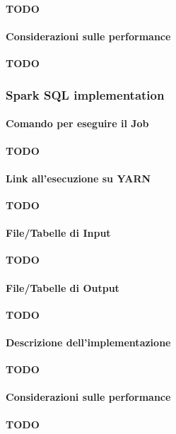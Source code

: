   \textbf{TODO}

  \paragraph{Considerazioni sulle performance}\label{par:job2:mapreduce:performance}

  \textbf{TODO}

  \subsubsection{Spark SQL implementation}\label{subsub:job2:spark}

  \paragraph{Comando per eseguire il Job}\label{par:job2:spark:cmd}

  \textbf{TODO}

  \paragraph{Link all'esecuzione su YARN}\label{par:job2:spark:yarn}

  \textbf{TODO}

  \paragraph{File/Tabelle di Input}\label{par:job2:spark:input}

  \textbf{TODO}

  \paragraph{File/Tabelle di Output}\label{par:job2:spark:output}

  \textbf{TODO}

  \paragraph{Descrizione dell'implementazione}\label{par:job2:spark:implementation}

  \textbf{TODO}

  \paragraph{Considerazioni sulle performance}\label{par:job2:spark:performance}

  \textbf{TODO}

